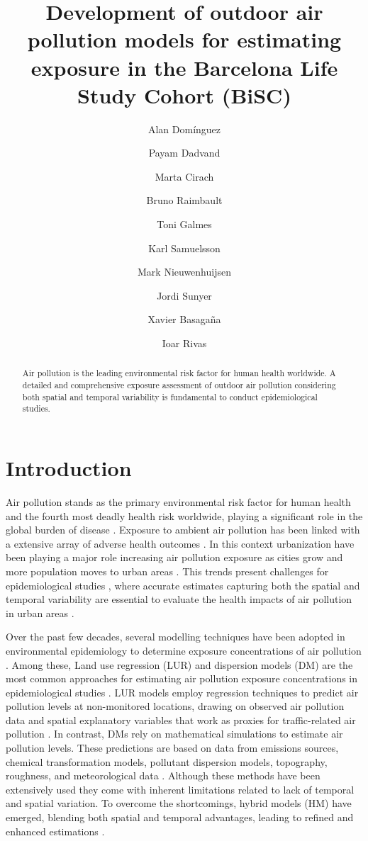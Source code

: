 \documentclass{article}
\title{\textbf{Development of outdoor air pollution models for estimating exposure in the Barcelona Life Study Cohort (BiSC)}}
\author[1, 2, 3]{Alan Domínguez}
\author[1, 3, 4]{Payam Dadvand}
\author[1]{Marta Cirach}
\author[1]{Bruno Raimbault}
\author[1]{Toni Galmes}
\author[1]{Karl Samuelsson}
\author[1, 2, 3]{Mark Nieuwenhuijsen}
\author[1, 2, 3]{Jordi Sunyer}
\author[1, 2, 3]{Xavier Basagaña}
\author[1, 3]{Ioar Rivas}
\affil[1]{Barcelona Institute for Global Health (ISGlobal), Barcelona, Spain.}
\affil[2]{Universitat Pompeu Fabra (UPF), Barcelona, Spain.}
\affil[3]{CIBER Epidemiología y Salud Pública (CIBERESP), Madrid, Spain.}
\affil[4]{London School of Hygiene and Tropical Medicine (LSHTM), London, UK.}
\begin{document}
\maketitle

\begin{abstract}

Air pollution is the leading environmental risk factor for human health worldwide. A detailed and comprehensive exposure assessment of outdoor air pollution considering both spatial and temporal variability is fundamental to conduct epidemiological studies.  

\end{abstract}

\section{Introduction}

Air pollution stands as the primary environmental risk factor for human health and the fourth most deadly health risk worldwide, playing a significant role in the global burden of disease \cite{cohen2017, he2020state}. Exposure to ambient air pollution has been linked with a extensive array of adverse health outcomes \cite{boogaard2022, guxens2022hei, haddad2023}. In this context urbanization have been playing a major role increasing air pollution exposure as cities grow and more population moves to urban areas \cite{nieuwenhuijsen2016}. This trends present challenges for epidemiological studies \cite{tonne2017}, where accurate estimates capturing both the spatial and temporal variability are essential to evaluate the health impacts of air pollution in urban areas \cite{boogaard2022}. 

Over the past few decades, several modelling techniques have been adopted in environmental epidemiology to determine exposure concentrations of air pollution \cite{hoek2017, di2019no2, di2019pm25, stafoggia2019, stafoggia2020}. Among these, Land use regression (LUR) and dispersion models (DM) are the most common approaches for estimating air pollution exposure concentrations in epidemiological studies \cite{gulliver2015, dehoogh2014}. LUR models employ regression techniques to predict air pollution levels at non-monitored locations, drawing on observed air pollution data and spatial explanatory variables that work as proxies for traffic-related air pollution \cite{briggs1997, hoek2008}. In contrast, DMs rely on mathematical simulations to estimate air pollution levels. These predictions are based on data from emissions sources, chemical transformation models, pollutant dispersion models, topography, roughness, and meteorological data \cite{hoek2017}. Although these methods have been extensively used they come with inherent limitations related to lack of temporal and spatial variation. To overcome the shortcomings, hybrid models (HM) have emerged, blending both spatial and temporal advantages, leading to refined and enhanced estimations \cite{hoek2017, korek2017, tularam2021, oh2021}. 
\end{document}
